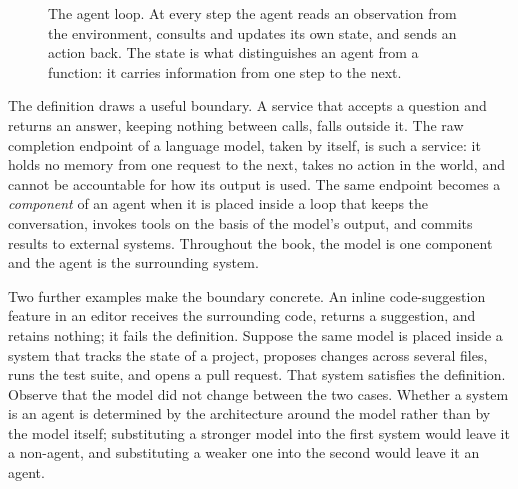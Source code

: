 \documentclass[11pt]{book}
\begin{document}
\begin{figure}[htbp]
\centering
{}
\caption{The agent loop. At every step the agent reads an observation from the environment, consults and updates its own state, and sends an action back. The state is what distinguishes an agent from a function: it carries information from one step to the next.}
\label{fig:agent-loop}
\end{figure}

The definition draws a useful boundary. A service that accepts a question and returns an answer, keeping nothing between calls, falls outside it. The raw completion endpoint of a language model, taken by itself, is such a service: it holds no memory from one request to the next, takes no action in the world, and cannot be accountable for how its output is used. The same endpoint becomes a \textit{component} of an agent when it is placed inside a loop that keeps the conversation, invokes tools on the basis of the model's output, and commits results to external systems. Throughout the book, the model is one component and the agent is the surrounding system.

Two further examples make the boundary concrete. An inline code-suggestion feature in an editor receives the surrounding code, returns a suggestion, and retains nothing; it fails the definition. Suppose the same model is placed inside a system that tracks the state of a project, proposes changes across several files, runs the test suite, and opens a pull request. That system satisfies the definition. Observe that the model did not change between the two cases. Whether a system is an agent is determined by the architecture around the model rather than by the model itself; substituting a stronger model into the first system would leave it a non-agent, and substituting a weaker one into the second would leave it an agent.
\end{document}
